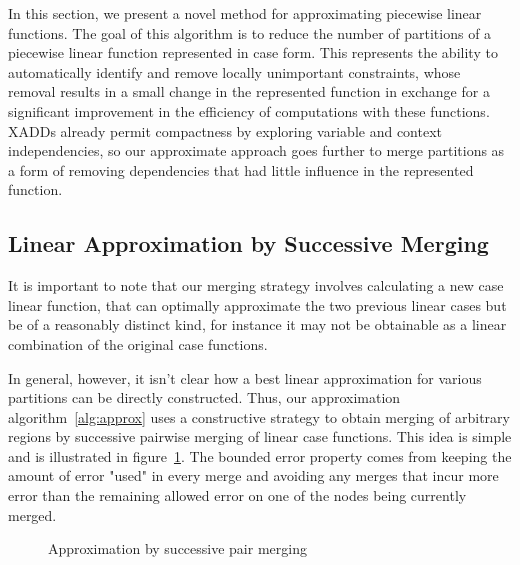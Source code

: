 In this section, we present a novel method for approximating piecewise linear functions. The goal of this algorithm is to reduce the number of partitions of a piecewise linear function represented in case form. This represents the ability to automatically identify and remove locally unimportant constraints, whose removal results in a small change in the represented function in exchange for a significant improvement in the efficiency of computations with these functions. XADDs already permit compactness by exploring variable and context independencies, so our approximate approach goes further to merge partitions as a form of removing dependencies that had little influence in the represented function.

\subsection{ Linear Approximation by Successive Merging}
It is important to note that our merging strategy involves calculating a new case linear function, that can optimally approximate the two previous linear cases but be of a reasonably distinct kind, for instance it may not be obtainable as a linear combination of the original case functions. 

In general, however, it isn't clear how a best linear approximation for various partitions can be directly constructed. Thus, our approximation algorithm~\ref{alg:approx} uses a constructive strategy to obtain merging of arbitrary regions by successive pairwise merging of linear case functions. This idea is simple and is illustrated in figure~\ref{fig:steplining}. The bounded error property comes from keeping the amount of error "used" in every merge and avoiding any merges that incur more error than the remaining allowed error on one of the nodes being currently merged.

\begin{figure}[!ht]
\centering



\caption{ Approximation by successive pair merging}
 \label{fig:steplining}
\end{figure}

